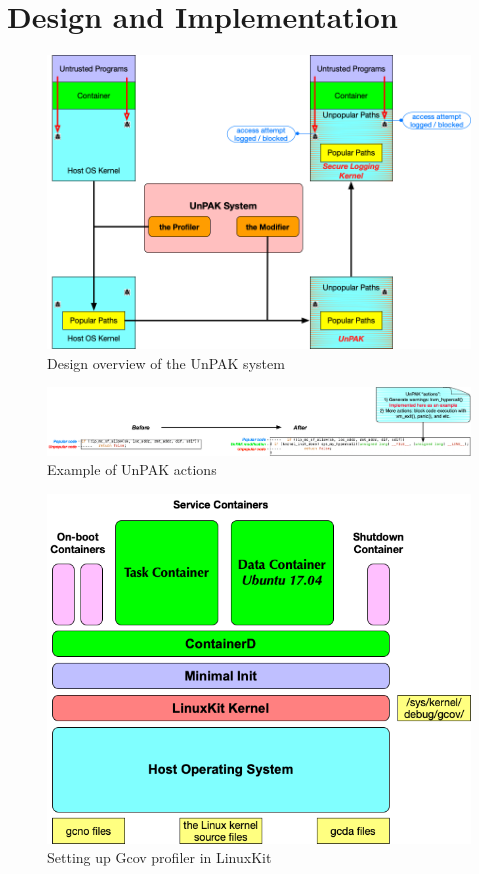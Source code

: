 \section{Design and Implementation}
\label{sec.design}

\begin{figure}
\centering
\includegraphics[width=2.0\columnwidth]{diagram/design.png}
\caption{\small Design overview of the UnPAK system}
\label{fig:design}
\end{figure}

\begin{figure}
\centering
\includegraphics[width=2.2\columnwidth]{diagram/UnPAK-action.png}
\caption{\small Example of UnPAK actions}
\label{fig:UnPAKaction}
\end{figure}

\begin{figure}
\centering
\includegraphics[width=1.5\columnwidth]{diagram/linuxkit-kernel-profiler.png}
\caption{\small Setting up Gcov profiler in LinuxKit}
\label{fig:linuxkit-kernel-profiler}
\end{figure}

